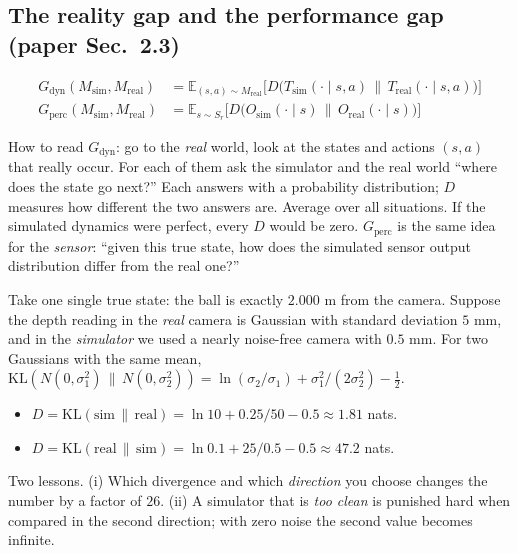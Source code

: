 \documentclass[11pt,a4paper]{article}
\newcommand{\Ms}{M_{\mathrm{sim}}}
\newcommand{\Mr}{M_{\mathrm{real}}}
\newcommand{\Tsim}{T_{\mathrm{sim}}}
\newcommand{\Treal}{T_{\mathrm{real}}}
\newcommand{\Osim}{O_{\mathrm{sim}}}
\newcommand{\Oreal}{O_{\mathrm{real}}}
\begin{document}
\subsection{The reality gap and the performance gap \textnormal{(paper Sec.~2.3)}}

\begin{eqbox}
\begin{align*}
G_{\mathrm{dyn}}(\Ms,\Mr)&=\mathbb E_{(s,a)\sim \Mr}\Big[D\big(\Tsim(\cdot\mid s,a)\,\big\|\,\Treal(\cdot\mid s,a)\big)\Big]\\
G_{\mathrm{perc}}(\Ms,\Mr)&=\mathbb E_{s\sim S_r}\Big[D\big(\Osim(\cdot\mid s)\,\big\|\,\Oreal(\cdot\mid s)\big)\Big]
\end{align*}
\end{eqbox}

How to read $G_{\mathrm{dyn}}$: go to the \emph{real} world, look at the states and actions $(s,a)$
that really occur. For each of them ask the simulator and the real world ``where does the state go
next?'' Each answers with a probability distribution; $D$ measures how different the two answers
are. Average over all situations. If the simulated dynamics were perfect, every $D$ would be zero.
$G_{\mathrm{perc}}$ is the same idea for the \emph{sensor}: ``given this true state, how does the
simulated sensor output distribution differ from the real one?''

\begin{toy}
Take one single true state: the ball is exactly $2.000$ m from the camera. Suppose the depth
reading in the \emph{real} camera is Gaussian with standard deviation $5$ mm, and in the
\emph{simulator} we used a nearly noise-free camera with $0.5$ mm. For two Gaussians with the same
mean, $\mathrm{KL}(N(0,\sigma_1^2)\,\|\,N(0,\sigma_2^2))=\ln(\sigma_2/\sigma_1)+\sigma_1^2/(2\sigma_2^2)-\tfrac12$.
\begin{itemize}
\item $D=\mathrm{KL}(\text{sim}\,\|\,\text{real})=\ln 10+0.25/50-0.5\approx 1.81$ nats.
\item $D=\mathrm{KL}(\text{real}\,\|\,\text{sim})=\ln 0.1+25/0.5-0.5\approx 47.2$ nats.
\end{itemize}
Two lessons. (i) Which divergence and which \emph{direction} you choose changes the number by a
factor of $26$. (ii) A simulator that is \emph{too clean} is punished hard when compared in the
second direction; with zero noise the second value becomes infinite.
\end{toy}
\end{document}
